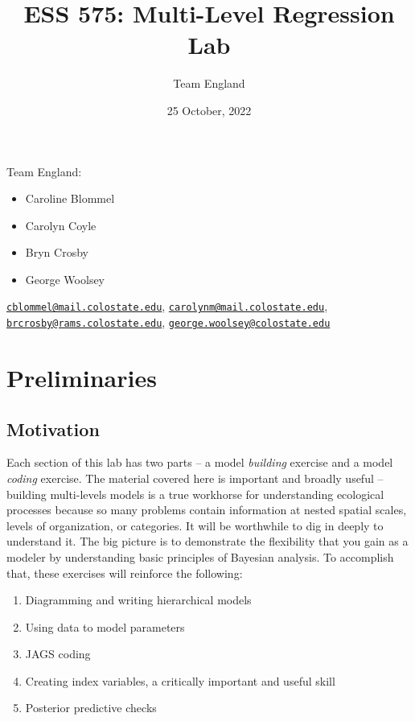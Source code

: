 \documentclass[
]{article}
\title{ESS 575: Multi-Level Regression Lab}
\author{Team England}
\date{25 October, 2022}
\providecommand{\tightlist}{%
  \setlength{\itemsep}{0pt}\setlength{\parskip}{0pt}}
\begin{document}
\maketitle

{
\hypersetup{linkcolor=}
\setcounter{tocdepth}{3}
\tableofcontents
}
Team England:

\begin{itemize}
\tightlist
\item
  Caroline Blommel
\item
  Carolyn Coyle
\item
  Bryn Crosby
\item
  George Woolsey
\end{itemize}

\href{mailto:cblommel@mail.colostate.edu}{\nolinkurl{cblommel@mail.colostate.edu}},
\href{mailto:carolynm@mail.colostate.edu}{\nolinkurl{carolynm@mail.colostate.edu}},
\href{mailto:brcrosby@rams.colostate.edu}{\nolinkurl{brcrosby@rams.colostate.edu}},
\href{mailto:george.woolsey@colostate.edu}{\nolinkurl{george.woolsey@colostate.edu}}

\hypertarget{preliminaries}{%
\section{Preliminaries}\label{preliminaries}}

\hypertarget{motivation}{%
\subsection{Motivation}\label{motivation}}

Each section of this lab has two parts -- a model \emph{building}
exercise and a model \emph{coding} exercise. The material covered here
is important and broadly useful -- building multi-levels models is a
true workhorse for understanding ecological processes because so many
problems contain information at nested spatial scales, levels of
organization, or categories. It will be worthwhile to dig in deeply to
understand it. The big picture is to demonstrate the flexibility that
you gain as a modeler by understanding basic principles of Bayesian
analysis. To accomplish that, these exercises will reinforce the
following:

\begin{enumerate}
\def\labelenumi{\arabic{enumi}.}
\tightlist
\item
  Diagramming and writing hierarchical models
\item
  Using data to model parameters
\item
  JAGS coding
\item
  Creating index variables, a critically important and useful skill
\item
  Posterior predictive checks
\end{enumerate}
\end{document}

